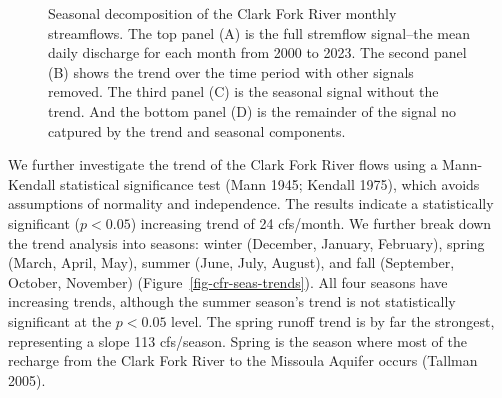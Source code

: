 \documentclass[
  letterpaper,
  DIV=11,
  numbers=noendperiod]{scrartcl}
\begin{document}
\begin{figure}


\caption{\label{fig-cfr-stl}Seasonal decomposition of the Clark Fork
River monthly streamflows. The top panel (A) is the full stremflow
signal--the mean daily discharge for each month from 2000 to 2023. The
second panel (B) shows the trend over the time period with other signals
removed. The third panel (C) is the seasonal signal without the trend.
And the bottom panel (D) is the remainder of the signal no catpured by
the trend and seasonal components.}

\end{figure}%

We further investigate the trend of the Clark Fork River flows using a
Mann-Kendall statistical significance test (Mann 1945; Kendall 1975),
which avoids assumptions of normality and independence. The results
indicate a statistically significant (\(p<0.05\)) increasing trend of 24
cfs/month. We further break down the trend analysis into seasons: winter
(December, January, February), spring (March, April, May), summer (June,
July, August), and fall (September, October, November)
(Figure~\ref{fig-cfr-seas-trends}). All four seasons have increasing
trends, although the summer season's trend is not statistically
significant at the \(p<0.05\) level. The spring runoff trend is by far
the strongest, representing a slope 113 cfs/season. Spring is the season
where most of the recharge from the Clark Fork River to the Missoula
Aquifer occurs (Tallman 2005).
\end{document}
